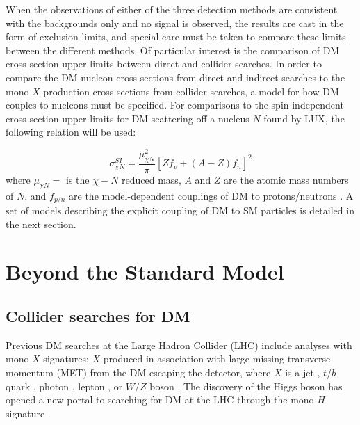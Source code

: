 \indent When the observations of either of the three detection methods are consistent with the backgrounds only and no signal is observed, the results are cast in the form of exclusion limits, and special care must be taken to compare these limits between the different methods. Of particular interest is the comparison of DM cross section upper limits between direct and collider searches. In order to compare the DM-nucleon cross sections from direct and indirect searches to the mono-$X$ production cross sections from collider searches, a model for how DM couples to nucleons must be specified. For comparisons to the spin-independent cross section upper limits for DM scattering off a nucleus $N$ found by LUX, the following relation will be used:

\begin{equation}
\sigma^{SI}_{\chi N} = \frac{\mu^2_{\chi N}}{\pi} [Zf_p + (A-Z)f_n]^2
\end{equation}
where $\mu_{\chi N} = $ is the $\chi-N$ reduced mass, $A$ and $Z$ are the atomic mass numbers of $N$, and $f_{p/n}$ are the model-dependent couplings of DM to protons/neutrons \cite{Carpenter:2013xra}. A set of models describing the explicit coupling of DM to SM particles is detailed in the next section.

\section{Beyond the Standard Model}

\subsection{Collider searches for DM}

Previous DM searches at the Large Hadron Collider (LHC) include analyses with mono-$X$ signatures: $X$ produced in association with large missing transverse momentum (MET) from the DM escaping the detector, where $X$ is a jet \cite{Aad:2015zva, Khachatryan:2014rra}, $t$/$b$ quark \cite{Aad:2014vea, Khachatryan:2014uma, Khachatryan:2015nua}, photon \cite{Aad:2014tda, Chatrchyan:2012tea, Khachatryan:2014rwa}, lepton \cite{Khachatryan:2014tva, ATLAS:2014wra}, or $W$/$Z$ boson \cite{Aad:2014vka, Aad:2013oja, Khachatryan:2015bbl}. The discovery of the Higgs boson has opened a new portal to searching for DM at the LHC through the mono-$H$ signature \cite{Carpenter:2013xra, Berlin:2014cfa}. 

